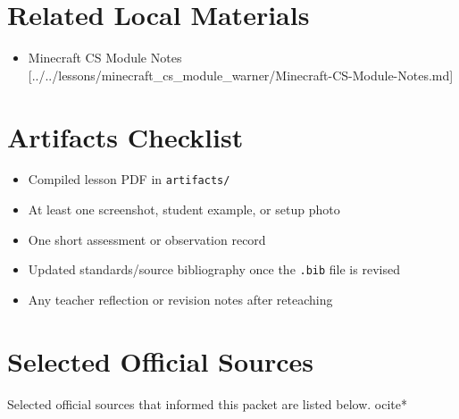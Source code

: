 \documentclass[11pt]{article}
\begin{document}
\section*{Related Local Materials}
\begin{itemize}[leftmargin=*]
\item Minecraft CS Module Notes [../../lessons/minecraft\_cs\_module\_warner/Minecraft-CS-Module-Notes.md]
\end{itemize}

\section*{Artifacts Checklist}
\begin{itemize}[leftmargin=*]
\item Compiled lesson PDF in \texttt{artifacts/}
\item At least one screenshot, student example, or setup photo
\item One short assessment or observation record
\item Updated standards/source bibliography once the \texttt{.bib} file is revised
\item Any teacher reflection or revision notes after reteaching
\end{itemize}

\section*{Selected Official Sources}
Selected official sources that informed this packet are listed below.
ocite{*}



\end{document}
